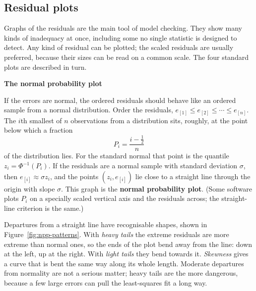 \documentclass[11pt,a4paper]{article}
\numberwithin{equation}{section}
\theoremstyle{definition}
\newcommand{\subhead}[1]{%
  \par\medskip\noindent\textbf{#1}\par\nobreak\smallskip}
\begin{document}
\subsection{Residual plots}
Graphs of the residuals are the main tool of model checking. They show many kinds of
inadequacy at once, including some no single statistic is designed to detect. Any kind of
residual can be plotted; the scaled residuals are usually preferred, because their sizes
can be read on a common scale. The four standard plots are described in turn.

\subhead{The normal probability plot}
If the errors are normal, the ordered residuals should behave like an ordered sample from
a normal distribution. Order the residuals,
$e_{[1]} \le e_{[2]} \le \cdots \le e_{[n]}$. The $i$th smallest of $n$ observations from
a distribution sits, roughly, at the point below which a fraction
\[
P_i = \frac{i - \tfrac12}{n}
\]
of the distribution lies. For the standard normal that point is the quantile
$z_i = \Phi^{-1}(P_i)$. If the residuals are a normal sample with standard deviation
$\sigma$, then $e_{[i]} \approx \sigma z_i$, and the points $(z_i, e_{[i]})$ lie close to a
straight line through the origin with slope $\sigma$. This graph is the \textbf{normal
probability plot}. (Some software plots $P_i$ on a specially scaled vertical axis and the
residuals across; the straight-line criterion is the same.)

Departures from a straight line have recognisable shapes, shown in
Figure~\ref{fig:npp-patterns}. With \emph{heavy tails} the extreme residuals are more extreme
than normal ones, so the ends of the plot bend away from the line: down at the left, up at
the right. With \emph{light tails} they bend towards it. \emph{Skewness} gives a curve
that is bent the same way along its whole length. Moderate departures from normality are
not a serious matter; heavy tails are the more dangerous, because a few large errors can
pull the least-squares fit a long way.
\end{document}
